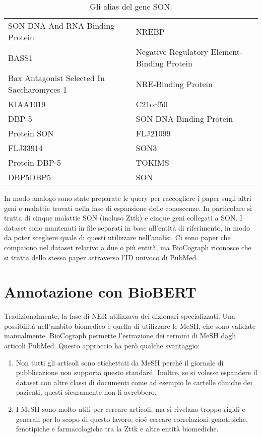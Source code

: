 \documentclass[12pt]{report}
\begin{document}
\begin{table}[htb]
\centering
\begin{tabular}{|l l|}
    \hline
    \small{SON DNA And RNA Binding Protein} & \small{NREBP}\\
    \small{BASS1} & \small{Negative Regulatory Element-Binding Protein}\\
    \small{Bax Antagonist Selected In Saccharomyces 1} & \small{NRE-Binding Protein} \\
    \small{KIAA1019} & \small{C21orf50} \\
    \small{DBP-5} & \small{SON DNA Binding Protein} \\
    \small{Protein SON} & \small{FLJ21099} \\
    \small{FLJ33914} & \small{SON3} \\
    \small{Protein DBP-5} & \small{TOKIMS} \\
    \small{DBP5DBP5} & \small{SON} \\
    \hline
\end{tabular}
\caption{\footnotesize{Gli alias del gene SON.}}
\label{tab:son_alias}
\end{table}

In modo analogo sono state preparate le query per raccogliere i paper sugli altri geni e malattie trovati nella fase di espansione delle conoscenze. In particolare si tratta di cinque malattie SON (incluso Zttk) e cinque geni collegati a SON. I dataset sono mantenuti in file separati in base all'entità di riferimento, in modo da poter scegliere quale di questi utilizzare nell'analisi. Ci sono paper che compaiono nel dataset relativo a due o più entità, ma BioCograph riconosce che si tratta dello stesso paper attraverso l'ID univoco di PubMed.


\section{Annotazione con BioBERT\label{biobert_pipeline}}
Tradizionalmente, la fase di NER utilizzava dei dizionari specializzati. Una possibilità nell'ambito biomedico è quella di utilizzare le MeSH, che sono validate manualmente. BioCograph  permette l'estrazione dei termini di MeSH dagli articoli PubMed. Questo approccio ha però qualche svantaggio:
\begin{enumerate}
    \item Non tutti gli articoli sono etichettati da MeSH perché il giornale di pubblicazione non supporta questo standard. Inoltre, se si volesse espandere il dataset con altre classi di documenti come ad esempio le cartelle cliniche dei pazienti, questi sicuramente non li avrebbero.
    \item I MeSH sono molto utili per cercare articoli, ma si rivelano troppo rigidi e generali per lo scopo di questo lavoro, cioè cercare correlazioni genotipiche, fenotipiche e farmacologiche tra la Zttk e altre entità biomediche.
\end{enumerate}
\end{document}
